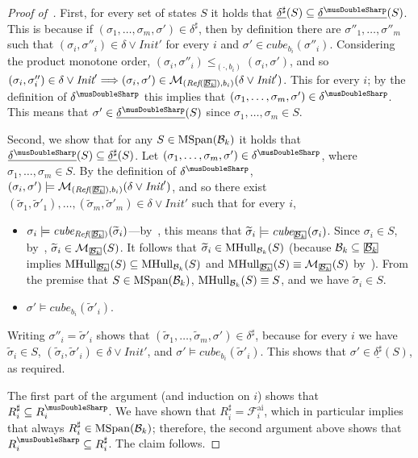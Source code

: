 \documentclass[acmsmall,screen]{acmart}
\renewcommand{\implies}{\Longrightarrow}
\newcommand{\Init}{{\textit{Init}}}
\newcommand{\tr}{\delta}
\newcommand{\Frameai}{\mathcal{F}^{\text{ai}}}
\newcommand{\reflextr}[1]{\underline{#1}}
\newcommand{\postimage}[2]{{\reflextr{#1}}({#2})}
\newcommand{\bkwrch}[1]{\mathcal{B}_{#1}}
\newcommand{\cubemon}[2]{\textit{cube}_{{#2}}({#1})}
\newcommand{\moncube}[2]{\cubemon{#1}{#2}}
\newcommand{\monox}[2]{\mathcal{M}_{#2}({#1})}
\newcommand{\mspan}[1]{{\rm MSpan}({#1})}
\newcommand{\bkwspan}[1]{\mspan{\bkwrch{#1}}}
\newcommand{\mhull}[2]{{\rm MHull}_{#2}({#1})}
\newcommand{\abs}[1]{{#1}^{\sharp}}
\newcommand{\absr}[1]{{#1}^{\musDoubleSharp}}
\newcommand{\bkcube}{b}
\newcommand{\reflect}[1]{\textit{Ref}({#1})}
\newcommand\mathbox[1]{\mathord{\ThisStyle{%
  \fboxsep0\LMpt\relax\kern1\LMpt\fbox{$\SavedStyle#1$}\kern1\LMpt}}}
\newcommand{\cubejoin}[1]{\mathbox{#1}}
\begin{document}
{\begin{proof}[Proof of~]
First, for every set of states $S$ it holds that $\postimage{\abs{\tr}}{S} \subseteq \postimage{\absr{\tr}}{S}$. This is because if $(\sigma_1,\ldots,\sigma_m,\sigma') \in \abs{\tr}$, then by definition there are $\sigma''_1,\ldots,\sigma''_m$ such that $(\sigma_i,\sigma''_i) \in \tr \lor \Init'$ for every $i$ and $\sigma' \in \moncube{\sigma''_i}{\bkcube_i}$.
Considering the product monotone order, $(\sigma_i,\sigma''_i) \leq_{(\cdot,\bkcube_i)} (\sigma_i,\sigma')$, and so $(\sigma_i,\sigma''_i) \in \tr \lor \Init' \implies (\sigma_i,\sigma') \in \monox{\tr \lor \Init'}{(\reflect{\cubejoin{\bkwrch{k}}},\bkcube_i)}$. This for every $i$; by the definition of $\absr{\tr}$ this implies that $(\sigma_1,\ldots,\sigma_m,\sigma') \in \absr{\tr}$. This means that $\sigma' \in \postimage{\absr{\tr}}{S}$ since $\sigma_1,\ldots,\sigma_m \in S$.

Second, we show that for any $S \in \mspan{\bkwrch{k}}$ it holds that $\postimage{\absr{\tr}}{S} \subseteq \postimage{\abs{\tr}}{S}$. Let $(\sigma_1,\ldots,\sigma_m,\sigma') \in \absr{\tr}$, where $\sigma_1,\ldots,\sigma_m \in S$. By the definition of $\absr{\tr}$, $(\sigma_i,\sigma') \models \monox{\tr \lor \Init'}{(\reflect{\cubejoin{\bkwrch{k}}},\bkcube_i)}$, and so there exist $(\widetilde{\sigma}_1,\widetilde{\sigma}'_1),\ldots,(\widetilde{\sigma}_m,\widetilde{\sigma}'_m) \in \tr \lor \Init'$ such that for every $i$,
\begin{itemize}
	\item $\sigma_i \models \moncube{\widetilde{\sigma}_i}{\reflect{\cubejoin{\bkwrch{k}}}}$---by~, this means that $\widetilde{\sigma}_i \models \moncube{\sigma_i}{\cubejoin{\bkwrch{k}}}$.
	Since $\sigma_i \in S$, by~, $\widetilde{\sigma}_i \in \monox{S}{\cubejoin{\bkwrch{k}}}$. It follows that $\widetilde{\sigma}_i \in \mhull{S}{\bkwrch{k}}$ (because $\bkwrch{k} \subseteq \cubejoin{\bkwrch{k}}$ implies $\mhull{S}{\cubejoin{\bkwrch{k}}} \subseteq \mhull{S}{\bkwrch{k}}$ and $\mhull{S}{\cubejoin{\bkwrch{k}}} \equiv \monox{S}{\cubejoin{\bkwrch{k}}}$ by~). From the premise that $S \in \mspan{\bkwrch{k}}$, $\mhull{S}{\bkwrch{k}} \equiv S$, and we have $\widetilde{\sigma}_i \in S$.

	\item $\sigma' \models \moncube{\widetilde{\sigma}'_i}{\bkcube_i}$.
\end{itemize}
Writing $\sigma''_i = \widetilde{\sigma}'_i$ shows that $(\widetilde{\sigma}_1,\ldots,\widetilde{\sigma}_m,\sigma') \in \abs{\tr}$, because for every $i$ we have $\widetilde{\sigma}_i \in S$, $(\widetilde{\sigma}_i,\widetilde{\sigma}'_i) \in \tr \lor \Init'$, and $\sigma' \models \moncube{\widetilde{\sigma}'_i}{\bkcube_i}$.
This shows that $\sigma' \in \postimage{\abs{\tr}}{S}$, as required.

%
%
The first part of the argument (and induction on $i$) shows that $\abs{R}_i \subseteq \absr{R}_i$.
%
We have shown that $\abs{R}_i = \Frameai_i$, which in particular implies that
%
always $\abs{R}_i \in \bkwspan{k}$; therefore, the second argument above shows that $\absr{R}_i \subseteq \abs{R}_i$.
The claim follows.
\end{proof}
}
\end{document}
